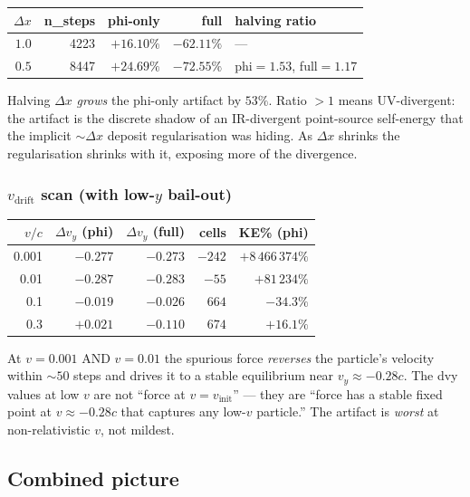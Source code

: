 \documentclass[11pt,a4paper]{article}
\begin{document}
\begin{center}
\begin{tabular}{rrrrl}
\toprule
$\Delta x$ & n\_steps & phi-only  & full       & halving ratio \\
\midrule
$1.0$ & 4223 & $+16.10\%$ & $-62.11\%$ & --- \\
$0.5$ & 8447 & $+24.69\%$ & $-72.55\%$ & phi$=1.53$, full$=1.17$ \\
\bottomrule
\end{tabular}
\end{center}

Halving $\Delta x$ \emph{grows} the phi-only artifact by $53\%$.
Ratio $> 1$ means UV-divergent: the artifact is the discrete shadow
of an IR-divergent point-source self-energy that the implicit
$\sim \Delta x$ deposit regularisation was hiding.  As $\Delta x$
shrinks the regularisation shrinks with it, exposing more of the
divergence.

\subsubsection*{$v_{\mathrm{drift}}$ scan (with low-$y$ bail-out)}

\begin{center}
\begin{tabular}{rrrrr}
\toprule
$v/c$  & $\Delta v_y$ (phi) & $\Delta v_y$ (full) & cells & KE\% (phi)    \\
\midrule
0.001 & $-0.277$ & $-0.273$ & $-242$ & $+8\,466\,374\%$  \\
0.01  & $-0.287$ & $-0.283$ & $-55$  & $+81\,234\%$    \\
0.1   & $-0.019$ & $-0.026$ & $664$  & $-34.3\%$    \\
0.3   & $+0.021$ & $-0.110$ & $674$  & $+16.1\%$     \\
\bottomrule
\end{tabular}
\end{center}

At $v=0.001$ AND $v=0.01$ the spurious force \emph{reverses} the
particle's velocity within $\sim 50$ steps and drives it to a stable
equilibrium near $v_y \approx -0.28c$.  The dvy values at low $v$ are
not ``force at $v=v_{\mathrm{init}}$'' --- they are ``force has a
stable fixed point at $v \approx -0.28c$ that captures any low-$v$
particle.''  The artifact is \emph{worst} at non-relativistic $v$,
not mildest.

\subsection{Combined picture}
\end{document}
